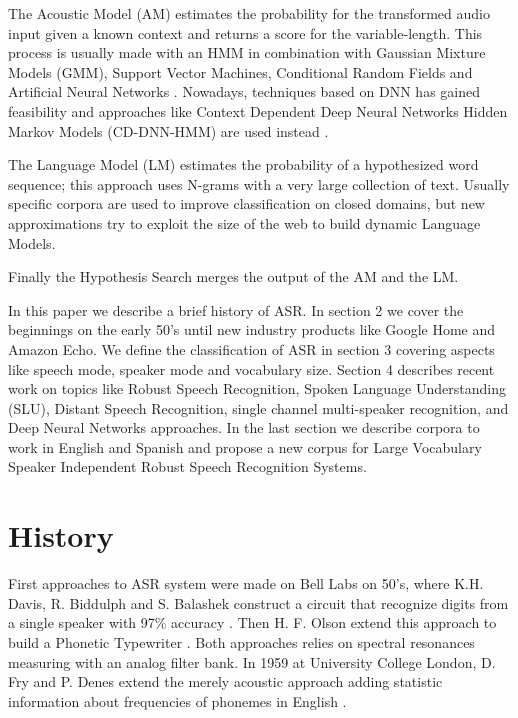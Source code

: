 The Acoustic Model (AM) estimates the probability for the transformed audio input given a known context and returns a score for the variable-length. This process is usually made with an HMM \cite{RabinerARecognition} in combination with Gaussian Mixture Models (GMM), Support Vector Machines, Conditional Random Fields and Artificial Neural Networks \cite{Jurafsky2000SpeechRecognition}. Nowadays, techniques based on DNN has gained feasibility and approaches like Context Dependent Deep Neural Networks Hidden Markov Models (CD-DNN-HMM) are used instead \cite{Deng2012}. 

The Language Model (LM) estimates the probability of a hypothesized word sequence; this approach uses N-grams with a very large collection of text. Usually specific corpora are used to improve classification on closed domains, but new approximations try to exploit the size of the web to build dynamic Language Models\cite{Oger2014Web-basedRecognition}.

Finally the Hypothesis Search merges the output of the AM and the LM. 

In this paper we describe a brief history of ASR. In section 2 we cover the beginnings on the early 50's until new industry products like Google Home and Amazon Echo. We define the classification of ASR in section 3 covering aspects like speech mode, speaker mode and vocabulary size. Section 4 describes recent work on topics like Robust Speech Recognition, Spoken Language Understanding (SLU), Distant Speech Recognition,  single channel multi-speaker recognition, and Deep Neural Networks approaches. In the last section we describe corpora to work in English and Spanish and propose a new corpus for Large Vocabulary Speaker Independent Robust Speech Recognition Systems.

\section{History}
First approaches to ASR system were made on Bell Labs on 50's, where K.H. Davis, R. Biddulph and S. Balashek construct a circuit that recognize digits from a single speaker with 97\% accuracy \cite{Davis1952AutomaticDigits}. Then H. F. Olson extend this approach to build a Phonetic Typewriter \cite{Olson1957PhoneticTypewriter}. Both approaches relies on spectral resonances measuring with an analog filter bank. In 1959 at University College London, D. Fry and P. Denes extend the merely acoustic approach adding statistic information about frequencies of phonemes in English \cite{BritishInstitutionofRadioEngineers.1959TheEngineers.}. 



